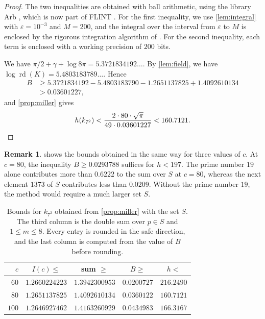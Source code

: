 \documentclass[11pt]{amsart}
\theoremstyle{plain}
\theoremstyle{definition}
\newtheorem{remark}[theorem]{Remark}
\begin{document}
\begin{proof}
The two inequalities are obtained with ball arithmetic, using the library Arb \cite{Jo17}, which is now part of FLINT \cite{FLINT}.
For the first inequality, we use \cref{lem:integral} with $\varepsilon = 10^{-3}$ and $M = 200$, and the integral over the interval from $\varepsilon$ to $M$ is enclosed by the rigorous integration algorithm of \cite{Jo18}.
For the second inequality, each term is enclosed with a working precision of $200$ bits.

We have $\pi/2 + \gamma + \log 8\pi = 5.3721834192\ldots$.
By \cref{lem:field}, we have $\log \operatorname{rd}(K) = 5.4803183789\ldots$.
Hence
\begin{align*}
B &\ge 5.3721834192 - 5.4803183790 - 1.2651137825 + 1.4092610134 \\
&> 0.03601227,
\end{align*}
and \cref{prop:miller} gives
\[
h(k_{7^2}) < \frac{2 \cdot 80 \cdot \sqrt{\pi}}{49 \cdot 0.03601227} < 160.7121 . \qedhere
\]
\end{proof}

\begin{remark} \label{rem:values}
 shows the bounds obtained in the same way for three values of $c$.
At $c = 80$, the inequality $B \ge 0.0293788$ suffices for $h < 197$.
The prime number $19$ alone contributes more than $0.6222$ to the sum over $S$ at $c = 80$, whereas the next element $1373$ of $S$ contributes less than $0.0209$.
Without the prime number $19$, the method would require a much larger set $S$.
\end{remark}

\begin{table}[h]
\centering
\begin{tabular}{rcccc}
\toprule
$c$ & $I(c) \le$ & sum $\ge$ & $B \ge$ & $h <$ \\
\midrule
$60$ & $1.2660224223$ & $1.3942300953$ & $0.0200727$ & $216.2490$ \\
$80$ & $1.2651137825$ & $1.4092610134$ & $0.0360122$ & $160.7121$ \\
$100$ & $1.2646927462$ & $1.4163260929$ & $0.0434983$ & $166.3167$ \\
\bottomrule
\end{tabular}
\caption{Bounds for $k_{7^2}$ obtained from \cref{prop:miller} with the set $S$. The third column is the double sum over $p \in S$ and $1 \le m \le 8$. Every entry is rounded in the safe direction, and the last column is computed from the value of $B$ before rounding.}
\label{tab:bounds}
\end{table}
\end{document}
